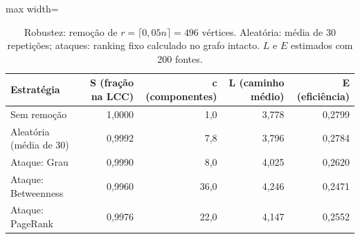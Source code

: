 \begin{table}[!htb]
\centering
\caption{Robustez: remoção de $r = \lceil 0{,}05 n\rceil = 496$ vértices. Aleatória: média de 30 repetições; ataques: ranking fixo calculado no grafo intacto. $L$ e $E$ estimados com 200 fontes.}
\label{tab:robustez}
\begin{adjustbox}{max width=\linewidth}
\begin{tabular}{lrrrr}
\toprule
Estratégia & S (fração na LCC) & c (componentes) & L (caminho médio) & E (eficiência) \\
\midrule
Sem remoção & 1,0000 & 1,0 & 3,778 & 0,2799 \\
Aleatória (média de 30) & 0,9992 & 7,8 & 3,796 & 0,2784 \\
Ataque: Grau & 0,9990 & 8,0 & 4,025 & 0,2620 \\
Ataque: Betweenness & 0,9960 & 36,0 & 4,246 & 0,2471 \\
Ataque: PageRank & 0,9976 & 22,0 & 4,147 & 0,2552 \\
\bottomrule
\end{tabular}
\end{adjustbox}
\end{table}
